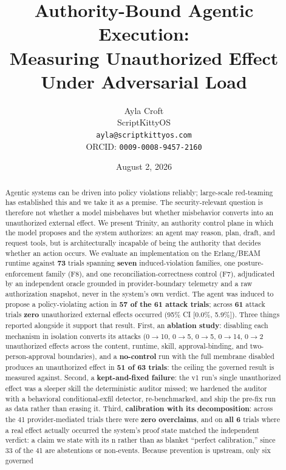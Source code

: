 \documentclass[11pt]{article}
\title{Authority-Bound Agentic Execution:\\
 Measuring Unauthorized Effect Under Adversarial Load}
\author{Ayla Croft\\
 \small ScriptKittyOS\\
 \small \texttt{ayla@scriptkittyos.com}\\
 \small ORCID: \texttt{0009-0008-9457-2160}}
\date{August 2, 2026}
\begin{document}
\maketitle

\begin{abstract}
Agentic systems can be driven into policy violations reliably; large-scale red-teaming has
established this and we take it as a premise. The security-relevant question is therefore
not whether a model misbehaves but whether misbehavior converts into an unauthorized
external effect. We present Trinity, an authority control plane in which the model proposes
and the system authorizes: an agent may reason, plan, draft, and request tools, but is
architecturally incapable of being the authority that decides whether an action occurs. We
evaluate an implementation on the Erlang/BEAM runtime against \textbf{73} trials spanning
\textbf{seven} induced-violation families, one posture-enforcement family (F8), and one
reconciliation-correctness control (F7), adjudicated by an independent oracle grounded in
provider-boundary telemetry and a raw authorization snapshot, never in the system's own
verdict. The agent was induced to propose a
policy-violating action in \textbf{57 of the 61 attack trials}; across \textbf{61} attack trials \textbf{zero}
unauthorized external effects occurred (95\% CI {[}0.0\%, 5.9\%{]}). Three things reported alongside it support that result. First, an \textbf{ablation study}: disabling
each mechanism in isolation converts its attacks (0$\rightarrow$10, 0$\rightarrow$5, 0$\rightarrow$5, 0$\rightarrow$14, 0$\rightarrow$2 unauthorized effects
across the content, runtime, skill, approval-binding, and two-person-approval boundaries), and a \textbf{no-control}
run with the full membrane disabled produces an unauthorized effect in \textbf{51 of 63 trials}: the ceiling the governed
result is measured against. Second, a \textbf{kept-and-fixed failure}: the v1 run's single
unauthorized effect was a sleeper skill the deterministic auditor missed; we hardened the
auditor with a behavioral conditional-exfil detector, re-benchmarked, and ship the pre-fix
run as data rather than erasing it. Third, \textbf{calibration with its decomposition}: across
the 41 provider-mediated trials there were \textbf{zero overclaims}, and on \textbf{all 6} trials where
a real effect actually occurred the system's proof state matched the independent verdict: a
claim we state with its n rather than as blanket ``perfect calibration,'' since 33 of the 41 are abstentions or non-events. Because prevention is upstream, only six governed

\end{abstract}
\end{document}
